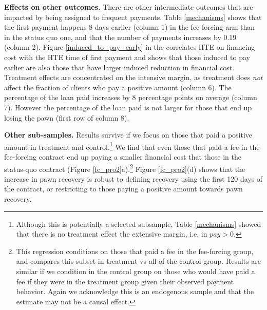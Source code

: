 \documentclass[oneside,11pt]{article}
\begin{document}
\vspace{.2in}
\noindent \textbf{Effects on other outcomes.} There are other intermediate outcomes that are impacted by being assigned to frequent payments. Table \ref{mechanisms} shows that the first payment happens 8 days earlier (column 1) in the fee-forcing arm than in the status quo one, and that the number of payments increases by 0.19 (column 2). Figure \ref{induced_to_pay_early} in the correlates HTE on financing cost with the HTE time of first payment and shows that those induced to pay earlier are also those that have larger induced reduction in financial cost. Treatment effects are concentrated on the intensive margin, as treatment does \textit{not} affect the fraction of clients who pay a positive amount (column 6). The percentage of the loan paid increases by 8 percentage points on average (column 7). However the percentage of the loan paid is not larger for those that end up losing the pawn (first row of column 8).

\vspace{.2in}
\noindent \textbf{Other sub-samples.}  Results survive if we focus on those that paid a positive amount in treatment and control.\footnote{Although this is potentially a selected subsample, Table \ref{mechanisms} showed that there is no treatment effect the extensive margin, i.e. in $pay>0$.} We find that even those that paid a fee in the fee-forcing contract end up paying a smaller financial cost that those in the status-quo contract (Figure \ref{fc_pro2}a).\footnote{This regression conditions on those that paid a fee in the fee-forcing group, and compares this subset in treatment vs all of the control group. Results are similar if we condition in the control group on those who would have paid a fee  if they were in the treatment group given their observed payment behavior. Again we acknowledge this is an endogenous sample and that the estimate may not be a causal effect.}  Figure \ref{fc_pro2}(d) shows that the increase in pawn recovery is robust to defining recovery using the first 120 days of the contract, or restricting to those paying a positive amount towards pawn recovery.

\end{document}
